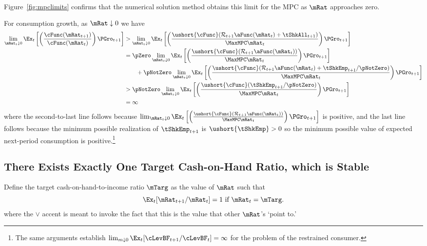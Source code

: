 \documentclass[./BufferStockTheory.tex]{subfiles}
\begin{document}
Figure~\ref{fig:mpclimits} confirms that the numerical solution method
obtains this limit for the MPC as $\mRat$ approaches zero.

For consumption growth, as $\mRat \downarrow 0$ we have
\begin{align*}
\lim_{\mRat_{t} \downarrow 0} \Ex_{t}\left[\left(\frac{\cFunc({\mRat}_{t+1})}{\cFunc(\mRat_t)}\right){\PGro}_{t+1}\right]
 & > \lim_{\mRat_{t} \downarrow 0} \Ex_{t}\left[\left(\frac{\ushort{\cFunc}({\mathcal{\mathcal{R}}}_{t+1}\aFunc(\mRat_{t})+{%
\tShkAll}_{t+1})}{\MaxMPC \mRat_{t}}\right){\PGro}_{t+1}\right]  \notag \\
  & = \pZero \lim_{\mRat_{t} \downarrow 0} \Ex_{t}\left[\left(\frac{\ushort{\cFunc}({\mathcal{\mathcal{R}}}_{t+1}\aFunc(\mRat_{t}))}{\MaxMPC \mRat_{t}}\right){\PGro}_{t+1}\right] \\
  & ~~~~~~ + \pNotZero \lim_{\mRat_{t} \downarrow 0}  \Ex_{t}\left[\left(\frac{\ushort{\cFunc}({\mathcal{\mathcal{R}}}_{t+1}\aFunc(\mRat_{t})+
\tShkEmp_{t+1}/\pNotZero)}{\MaxMPC \mRat_{t}}\right){\PGro}_{t+1}\right]  \\\notag
 & > \pNotZero \lim_{\mRat_{t} \downarrow 0} \Ex_{t}\left[\left(\frac{\ushort{\cFunc}(
\tShkEmp_{t+1}/\pNotZero)}{\MaxMPC \mRat_{t}}\right){\PGro}_{t+1}\right] \\
 & = \infty \nonumber
\end{align*}
where the second-to-last line follows because  $\lim_{\mRat_{t} \downarrow 0} \Ex_{t}\left[\left(\frac{\ushort{\cFunc}({\mathcal{\mathcal{R}}}_{t+1}\aFunc(\mRat_{t}))}{\MaxMPC \mRat_{t}}\right){\PGro}_{t+1}\right]$ is positive, and the last line follows because the minimum possible realization of $\tShkEmp_{t+1}$ is $\ushort{\tShkEmp}>0$ so the minimum possible value of expected next-period consumption is positive.\footnote{
The same arguments establish $\lim_{m \downarrow 0} \Ex_{t}[\cLevBF_{t+1}/\cLevBF_{t}] = \infty$
for the problem of the restrained consumer.%
}

\hypertarget{onetarget}{}
\subsection{There Exists Exactly One Target Cash-on-Hand Ratio,
which is Stable}

\label{subsec:onetarget}

Define the target cash-on-hand-to-income ratio $\mTarg$ as the value of $\mRat$
such that
\begin{equation}  
\Ex_t [{\mRat}_{t+1}/\mRat_t] = 1 \mbox{~if~} \mRat_t = \mTarg. \label{eq:mTarget}
\end{equation}
where the $\vee$ accent is meant to invoke the fact that this is the value that other $\mRat$'s `point to.'
\end{document}
